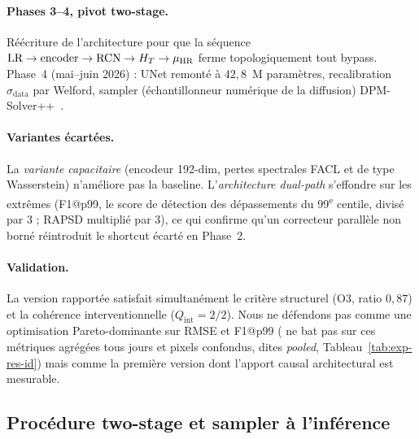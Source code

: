 \paragraph{Phases 3--4, pivot two-stage.} Réécriture de l'architecture pour que la séquence $\text{LR} \to \mathrm{encoder} \to \mathrm{RCN} \to H_T \to \mu_{\text{HR}}$ ferme topologiquement tout bypass. Phase~4 (mai--juin 2026) : UNet remonté à $42{,}8$~M paramètres, recalibration $\sigma_{\mathrm{data}}$ par Welford, sampler (échantillonneur numérique de la diffusion) DPM-Solver++~\cite{lu_dpmpp_2022}.

\paragraph{Variantes écartées.} La \emph{variante capacitaire} (encodeur 192-dim, pertes spectrales FACL et de type Wasserstein) n'améliore pas la baseline. L'\emph{architecture dual-path} s'effondre sur les extrêmes (F1@p99, le score de détection des dépassements du 99\textsuperscript{e} centile, divisé par 3 ; RAPSD multiplié par 3), ce qui confirme qu'un correcteur parallèle non borné réintroduit le shortcut écarté en Phase~2.

\paragraph{Validation.} La version rapportée satisfait simultanément le critère structurel (O3, ratio $0{,}87$) et la cohérence interventionnelle ($Q_{\mathrm{int}}=2/2$). Nous ne défendons pas \Oracle{} comme une optimisation Pareto-dominante sur RMSE et F1@p99 (\Oracle{} ne bat pas \CorrDiff{} sur ces métriques agrégées tous jours et pixels confondus, dites \emph{pooled}, Tableau~\ref{tab:exp-res-id}) mais comme la première version dont l'apport causal architectural est mesurable.

\subsection{Procédure two-stage et sampler à l'inférence}
\label{ssec:exp-traj-procedure}

